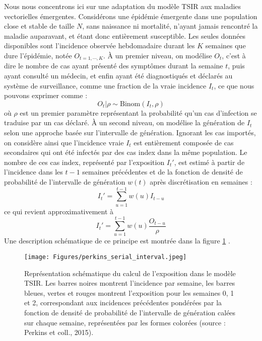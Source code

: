 Nous nous concentrons ici sur une adaptation du modèle TSIR aux maladies vectorielles émergentes.
Considérons une épidémie émergente dans une population close et stable de taille $N$, sans naissance ni mortalité, n'ayant jamais rencontré la maladie auparavant, et étant donc entièrement susceptible.
Les seules données disponibles sont l'incidence observée hebdomadaire durant les $K$ semaines que dure l'épidémie, notée $O_{t=1,\cdots,K}$.
\`A un premier niveau, on modélise $O_t$, c'est à dire le nombre de cas ayant présenté des symptômes durant la semaine $t$, puis ayant consulté un médecin, et enfin ayant été diagnostiqués et déclarés au système de surveillance, comme une fraction de la vraie incidence $I_t$, ce que nous pouvons exprimer comme :
\begin{equation}
\label{eqn:obslevel} 
O_{t}|\rho \sim \mbox{Binom}(I_{t},\rho)
\end{equation}
où $\rho$ est un premier paramètre représentant la probabilité qu'un cas d'infection se traduise par un cas déclaré.
\`A un second niveau, on modélise la génération de $I_t$ selon une approche basée sur l'intervalle de génération.
Ignorant les cas importés, on considère ainsi que l'incidence vraie $I_t$ est entièrement composée de cas secondaires qui ont été infectés par des cas index dans la même population.
Le nombre de ces cas index, représenté par l'exposition $I_t'$, est estimé à partir de l'incidence dans les $t-1$ semaines précédentes et de la fonction de densité de probabilité de l'intervalle de génération $w(t)$ après discrétisation en semaines :
\begin{equation}
I_t' = \sum_{u=1}^{t-1} w(u) I_{t-u}
\end{equation}
ce qui revient approximativement à
\begin{equation}
I_t' = \sum_{u=1}^{t-1} w(u) \frac{O_{t-u}}{\rho}
\end{equation}
Une description schématique de ce principe est montrée dans la figure \ref{fig:perkins_schema} .
\begin{figure}[t]
	\centering
	\texttt{[image: Figures/perkins\_serial\_interval.jpeg]}
	\caption[Représentation schématique du calcul de l'exposition dans le modèle TSIR (source : Perkins et coll., 2015)]{Représentation schématique du calcul de l'exposition dans le modèle TSIR. Les barres noires montrent l'incidence par semaine, les barres bleues, vertes et rouges montrent l'exposition pour les semaines 0, 1 et 2, correspondant aux incidences précédentes pondérées par la fonction de densité de probabilité de l'intervalle de génération calées sur chaque semaine, représentées par les formes colorées (source : Perkins et coll., 2015).}
	\label{fig:perkins_schema}
\end{figure}
